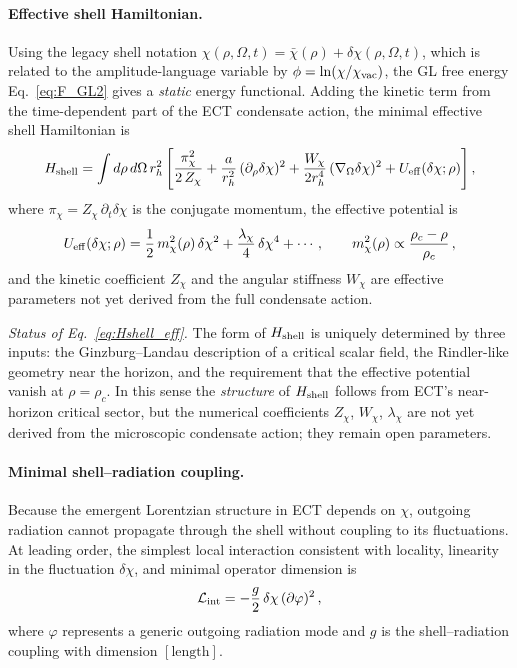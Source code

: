 \documentclass[11pt,a4paper]{article}
\numberwithin{equation}{section}
\begin{document}
\paragraph{Effective shell Hamiltonian.}

Using the legacy shell notation
$\chi(\rho,\Omega,t) = \bar\chi(\rho) + \delta\chi(\rho,\Omega,t)$,
which is related to the amplitude-language variable by
$\phi=\ln(\chi/\chi_{\rm vac})$,
the GL free energy Eq.~\eqref{eq:F_GL2} gives a \emph{static} energy functional.
Adding the kinetic term from the time-dependent part of the ECT condensate
action, the minimal effective shell Hamiltonian is
\begin{equation}
H_{\rm shell}
=
\int d\rho\,d\Omega\,r_h^2
\left[
\frac{\pi_\chi^2}{2\,Z_\chi}
+
\frac{a}{r_h^2}\,(\partial_\rho\delta\chi)^2
+
\frac{W_\chi}{2r_h^4}\,(\nabla_\Omega\delta\chi)^2
+
U_{\rm eff}(\delta\chi;\rho)
\right],
\label{eq:Hshell_eff}
\end{equation}
where $\pi_\chi = Z_\chi\,\partial_t\delta\chi$ is the conjugate momentum,
the effective potential is
\begin{equation}
U_{\rm eff}(\delta\chi;\rho)
=
\frac{1}{2}\,m_\chi^2(\rho)\,\delta\chi^2
+
\frac{\lambda_\chi}{4}\,\delta\chi^4
+ \cdots,
\qquad
m_\chi^2(\rho)
\propto
\frac{\rho_c - \rho}{\rho_c}\,,
\label{eq:Ueff_shell}
\end{equation}
and the kinetic coefficient $Z_\chi$ and the angular stiffness $W_\chi$ are
effective parameters not yet derived from the full condensate action.

\textit{Status of Eq.~\eqref{eq:Hshell_eff}.}
The form of $H_{\rm shell}$ is uniquely determined by three inputs: the
Ginzburg--Landau description of a critical scalar field, the Rindler-like
geometry near the horizon, and the requirement that the effective potential
vanish at $\rho = \rho_c$.
In this sense the \emph{structure} of $H_{\rm shell}$ follows from ECT's
near-horizon critical sector, but the numerical coefficients
$Z_\chi$, $W_\chi$, $\lambda_\chi$ are not yet derived from the microscopic
condensate action; they remain open parameters.

\paragraph{Minimal shell--radiation coupling.}

Because the emergent Lorentzian structure in ECT depends on $\chi$,
outgoing radiation cannot propagate through the shell without coupling to
its fluctuations.
At leading order, the simplest local interaction consistent with locality,
linearity in the fluctuation $\delta\chi$, and minimal operator dimension is
\begin{equation}
\mathcal{L}_{\rm int}
=
-\frac{g}{2}\,\delta\chi\,(\partial\varphi)^2\,,
\label{eq:Lint}
\end{equation}
where $\varphi$ represents a generic outgoing radiation mode and
$g$ is the shell--radiation coupling with dimension $[\text{length}]$.
\end{document}
